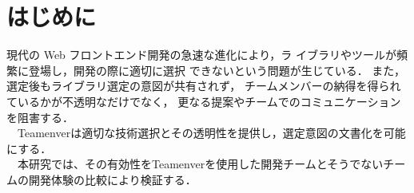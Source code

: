 \documentclass[main]{subfiles}
\begin{document}
\section{はじめに }
現代の Web フロントエンド開発の急速な進化により，ラ
イブラリやツールが頻繁に登場し，開発の際に適切に選択
できないという問題が生じている\cite{npm}\cite{medium.com}．
また，選定後もライブラリ選定の意図が共有されず，
チームメンバーの納得を得られているかが不透明なだけでなく，
更なる提案やチームでのコミュニケーションを阻害する．\\
　Teamenverは適切な技術選択とその透明性を提供し，選定意図の文書化を可能にする．\\
　本研究では、その有効性をTeamenverを使用した開発チームとそうでないチームの開発体験の比較により検証する．
\end{document}

